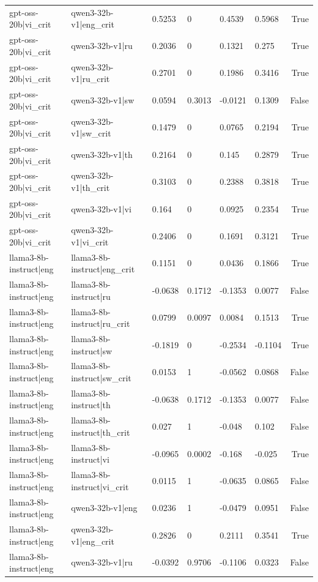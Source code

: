 \begin{table}
\begin{tabular}{llllllr}
gpt-oss-20b|vi_crit & qwen3-32b-v1|eng_crit & 0.5253 & 0 & 0.4539 & 0.5968 & True \\
gpt-oss-20b|vi_crit & qwen3-32b-v1|ru & 0.2036 & 0 & 0.1321 & 0.275 & True \\
gpt-oss-20b|vi_crit & qwen3-32b-v1|ru_crit & 0.2701 & 0 & 0.1986 & 0.3416 & True \\
gpt-oss-20b|vi_crit & qwen3-32b-v1|sw & 0.0594 & 0.3013 & -0.0121 & 0.1309 & False \\
gpt-oss-20b|vi_crit & qwen3-32b-v1|sw_crit & 0.1479 & 0 & 0.0765 & 0.2194 & True \\
gpt-oss-20b|vi_crit & qwen3-32b-v1|th & 0.2164 & 0 & 0.145 & 0.2879 & True \\
gpt-oss-20b|vi_crit & qwen3-32b-v1|th_crit & 0.3103 & 0 & 0.2388 & 0.3818 & True \\
gpt-oss-20b|vi_crit & qwen3-32b-v1|vi & 0.164 & 0 & 0.0925 & 0.2354 & True \\
gpt-oss-20b|vi_crit & qwen3-32b-v1|vi_crit & 0.2406 & 0 & 0.1691 & 0.3121 & True \\
llama3-8b-instruct|eng & llama3-8b-instruct|eng_crit & 0.1151 & 0 & 0.0436 & 0.1866 & True \\
llama3-8b-instruct|eng & llama3-8b-instruct|ru & -0.0638 & 0.1712 & -0.1353 & 0.0077 & False \\
llama3-8b-instruct|eng & llama3-8b-instruct|ru_crit & 0.0799 & 0.0097 & 0.0084 & 0.1513 & True \\
llama3-8b-instruct|eng & llama3-8b-instruct|sw & -0.1819 & 0 & -0.2534 & -0.1104 & True \\
llama3-8b-instruct|eng & llama3-8b-instruct|sw_crit & 0.0153 & 1 & -0.0562 & 0.0868 & False \\
llama3-8b-instruct|eng & llama3-8b-instruct|th & -0.0638 & 0.1712 & -0.1353 & 0.0077 & False \\
llama3-8b-instruct|eng & llama3-8b-instruct|th_crit & 0.027 & 1 & -0.048 & 0.102 & False \\
llama3-8b-instruct|eng & llama3-8b-instruct|vi & -0.0965 & 0.0002 & -0.168 & -0.025 & True \\
llama3-8b-instruct|eng & llama3-8b-instruct|vi_crit & 0.0115 & 1 & -0.0635 & 0.0865 & False \\
llama3-8b-instruct|eng & qwen3-32b-v1|eng & 0.0236 & 1 & -0.0479 & 0.0951 & False \\
llama3-8b-instruct|eng & qwen3-32b-v1|eng_crit & 0.2826 & 0 & 0.2111 & 0.3541 & True \\
llama3-8b-instruct|eng & qwen3-32b-v1|ru & -0.0392 & 0.9706 & -0.1106 & 0.0323 & False \\

\end{tabular}
\end{table}
